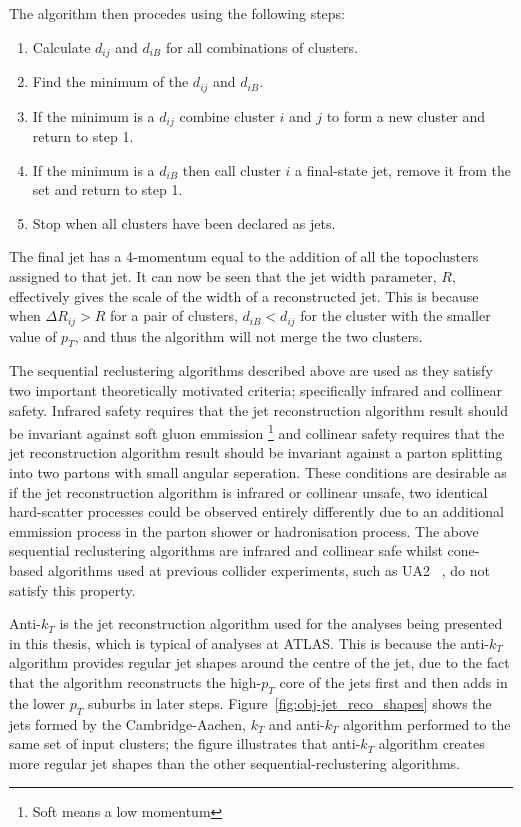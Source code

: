 \noindent The algorithm then procedes using the following steps:
\vspace{-1em}
\begin{enumerate}[nolistsep]
  \item Calculate $d_{ij}$ and $d_{iB}$ for all combinations of clusters.  
  \item Find the minimum of the $d_{ij}$ and $d_{iB}$. 
  \item If the minimum is a $d_{ij}$ combine cluster $i$ and $j$ to form a new cluster and return to step 1. 
  \item If the minimum is a $d_{iB}$ then call cluster $i$ a final-state jet, remove it from the set and return to step 1.  
  \item Stop when all clusters have been declared as jets. 
\end{enumerate} 
The final jet has a 4-momentum equal to the addition of all the topoclusters assigned to that jet.
It can now be seen that the jet width parameter, $R$, effectively gives the scale of the width of a reconstructed jet.
This is because when $\Delta R_{ij} > R$ for a pair of clusters,
$d_{iB} < d_{ij}$ for the cluster with the smaller value of ${p_T}$,
and thus the algorithm will not merge the two clusters.

The sequential reclustering algorithms described above are used as they satisfy two important theoretically motivated criteria;
specifically infrared and collinear safety.
Infrared safety requires that the jet reconstruction algorithm result should be invariant against soft gluon emmission \footnote{Soft means a low momentum}
and collinear safety requires that the jet reconstruction algorithm result should be invariant against a parton splitting into two partons with small angular seperation.
These conditions are desirable as if the jet reconstruction algorithm is infrared or collinear unsafe,
two identical hard-scatter processes could be observed entirely differently due to an additional emmission process in the parton shower or hadronisation process.
The above sequential reclustering algorithms are infrared and collinear safe
whilst cone-based algorithms used at previous collider experiments, such as UA2 ~\cite{obj-jet_reco_UA2}, do not satisfy this property.

Anti-$k_T$ is the jet reconstruction algorithm used for the analyses being presented in this thesis, which is typical of analyses at ATLAS.
This is because the anti-$k_T$ algorithm provides regular jet shapes around the centre of the jet,
due to the fact that the algorithm reconstructs the high-$p_T$ core of the jets first and then adds in the lower $p_T$ suburbs in later steps.
Figure~\ref{fig:obj-jet_reco_shapes} shows the jets formed by the Cambridge-Aachen, $k_T$ and anti-$k_T$ algorithm performed to the same set of input clusters;
the figure illustrates that anti-$k_T$ algorithm creates more regular jet shapes than the other sequential-reclustering algorithms.

